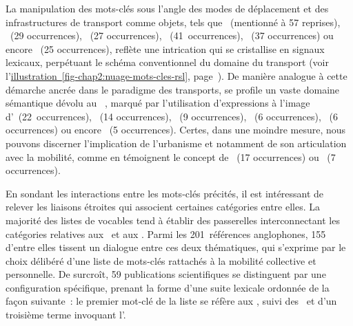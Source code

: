 \begin{refsegment}
La manipulation des mots-clés sous l'angle des modes de déplacement et des infrastructures de transport comme objets, tels que ~(mentionné à 57 reprises), ~(29 occurrences), ~(27 occurrences), ~(41~occurrences), ~(37 occurrences) ou encore ~(25 occurrences), reflète une intrication qui se cristallise en signaux lexicaux, perpétuant le schéma conventionnel du domaine du transport (voir l'\hyperref[fig-chap2:nuage-mots-cles-rsl]{illustration~\ref{fig-chap2:nuage-mots-cles-rsl}}, page~\pageref{fig-chap2:nuage-mots-cles-rsl}). De manière analogue à cette démarche ancrée dans le paradigme des transports, se profile un vaste domaine sémantique dévolu au ~\textcolor{blue}{\autocites{sheller_new_2006}[8]{sheller_mobilizing_2016}[13]{randell_no_2020}}, marqué par l'utilisation d'expressions à l'image d'~(22~occurrences), ~(14 occurrences), ~(9 occurrences), ~(6 occurrences), ~(6 occurrences) ou encore ~(5 occurrences). Certes, dans une moindre mesure, nous pouvons discerner l'implication de l'urbanisme et notamment de son articulation avec la mobilité, comme en témoignent le concept de ~(17 occurrences) ou ~(7 occurrences).%

En sondant les interactions entre les mots-clés précités, il est intéressant de relever les liaisons étroites qui associent certaines catégories entre elles. La majorité des listes de vocables tend à établir des passerelles interconnectant les catégories relatives aux ~et aux . Parmi les 201~références anglophones, 155 d'entre elles tissent un dialogue entre ces deux thématiques, qui s'exprime par le choix délibéré d'une liste de mots-clés rattachés à la mobilité collective et personnelle. De surcroît, 59 publications scientifiques se distinguent par une configuration spécifique, prenant la forme d'une suite lexicale ordonnée de la façon suivante~: le premier mot-clé de la liste se réfère aux , suivi des ~et d'un troisième terme invoquant l'.%


\end{refsegment}
